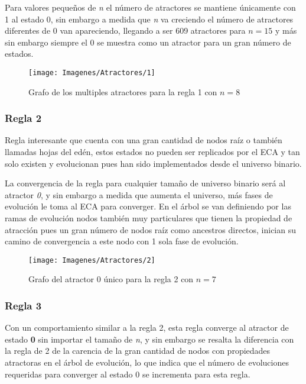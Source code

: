 \documentclass[]{article}
\begin{document}
				\hfill\break
				\justifying
				Para valores pequeños de \textit{n} el número de atractores se mantiene únicamente con 1 al estado 0, sin embargo a medida que \textit{n} va creciendo el número de atractores diferentes de 0 van apareciendo, llegando a ser 609 atractores para $n=15$ y más sin embargo siempre el 0 se muestra como un atractor para un gran número de estados.
				
				\begin{figure}[!h]
					\centering
					\texttt{[image: Imagenes/Atractores/1]}
					\caption{Grafo de los multiples atractores para la regla 1 con $n=8$}
					\label{Regla_1}
				\end{figure}
			
			
			\newpage
			\subsubsection{Regla 2}
				\justifying
				Regla interesante que cuenta con una gran cantidad de nodos raíz o también llamadas hojas del edén, estos estados no pueden ser replicados por el ECA y tan solo existen y evolucionan pues han sido implementados desde el universo binario.
				
				\hfill\break
				\justifying
				La convergencia de la regla para cualquier tamaño de universo binario será al atractor \textit{0}, y sin embargo a medida que aumenta el universo, más fases de evolución le toma al ECA para converger. En el árbol se van definiendo por las ramas de evolución nodos también muy particulares que tienen la propiedad de atracción pues un gran número de nodos raíz como ancestros directos, inician su camino de convergencia a este nodo con 1 sola fase de evolución.
				
				\hfill\break
				\hfill\break
				\begin{figure}[!h]
					\centering
					\texttt{[image: Imagenes/Atractores/2]}
					\caption{Grafo del atractor 0 único para la regla 2 con $n=7$}
					\label{Regla_2}
				\end{figure}
			
			\newpage
			\subsubsection{Regla 3}
				\justifying
				Con un comportamiento similar a la regla 2, esta regla converge al atractor de estado \textbf{0} sin  importar el tamaño de \textit{n}, y sin embargo se resalta la diferencia con la regla de 2 de la carencia de la gran cantidad de nodos con propiedades atractoras en el árbol de evolución, lo que indica que el número de evoluciones requeridas para converger al estado 0 se incrementa para esta regla.
				
\end{document}
